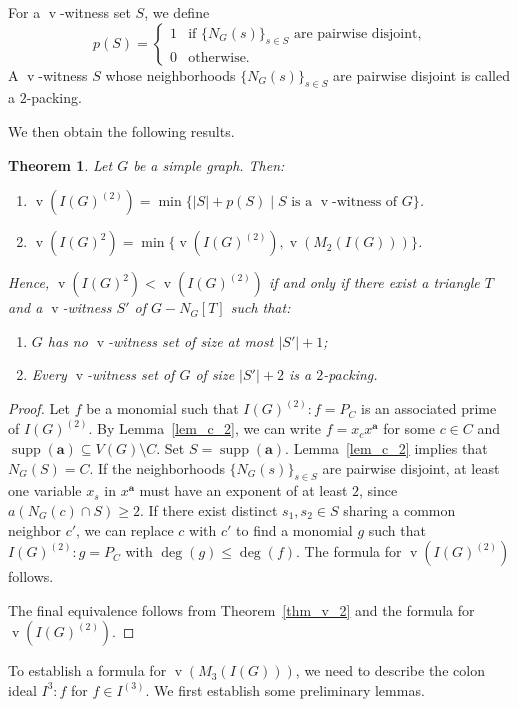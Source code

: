 \documentclass[12pt]{amsart}
\def\v{\operatorname{v}}
\def\deg{\operatorname{deg}}
\newtheorem{theorem}[lemma]{Theorem}
\begin{document}
For a $\v$-witness set $S$, we define 
$$p(S) = \begin{cases} 
1 & \text{if } \{N_G(s)\}_{s \in S} \text{ are pairwise disjoint,} \\
0 & \text{otherwise.}
\end{cases}$$
A $\v$-witness $S$ whose neighborhoods $\{N_G(s)\}_{s \in S}$ are pairwise disjoint is called a $2$-packing. 

We then obtain the following results.

\begin{theorem}\label{thm_equality_v_2} 
Let $G$ be a simple graph. Then:
\begin{enumerate}
    \item $\v(I(G)^{(2)}) = \min \{ |S| + p(S) \mid S \text{ is a } \v\text{-witness of } G \}$.
    \item $\v(I(G)^2) = \min \{ \v(I(G)^{(2)}), \v(M_2(I(G))) \}$.
\end{enumerate}
Hence, $\v(I(G)^2) < \v(I(G)^{(2)})$ if and only if there exist a triangle $T$ and a $\v$-witness $S'$ of $G - N_G[T]$ such that:
\begin{enumerate}
    \item $G$ has no $\v$-witness set of size at most $|S'| + 1$;
    \item Every $\v$-witness set of $G$ of size $|S'| + 2$ is a $2$-packing.
\end{enumerate}    
\end{theorem}

\begin{proof} 
Let $f$ be a monomial such that $I(G)^{(2)} : f = P_C$ is an associated prime of $I(G)^{(2)}$. By Lemma~\ref{lem_c_2}, we can write $f = x_c x^{\mathbf{a}}$ for some $c \in C$ and $\operatorname{supp}(\mathbf{a}) \subseteq V(G) \setminus C$. Set $S = \operatorname{supp}(\mathbf{a})$. Lemma~\ref{lem_c_2} implies that $N_G(S) = C$. If the neighborhoods $\{N_G(s)\}_{s \in S}$ are pairwise disjoint, at least one variable $x_s$ in $x^{\mathbf{a}}$ must have an exponent of at least $2$, since $a(N_G(c) \cap S) \ge 2$. If there exist distinct $s_1, s_2 \in S$ sharing a common neighbor $c'$, we can replace $c$ with $c'$ to find a monomial $g$ such that $I(G)^{(2)} : g = P_C$ with $\deg(g) \le \deg(f)$. The formula for $\v(I(G)^{(2)})$ follows.

The final equivalence follows from Theorem~\ref{thm_v_2} and the formula for $\v(I(G)^{(2)})$.
\end{proof}

To establish a formula for $\v(M_3(I(G)))$, we need to describe the colon ideal $I^3 : f$ for $f \in I^{(3)}$. We first establish some preliminary lemmas.
\end{document}
